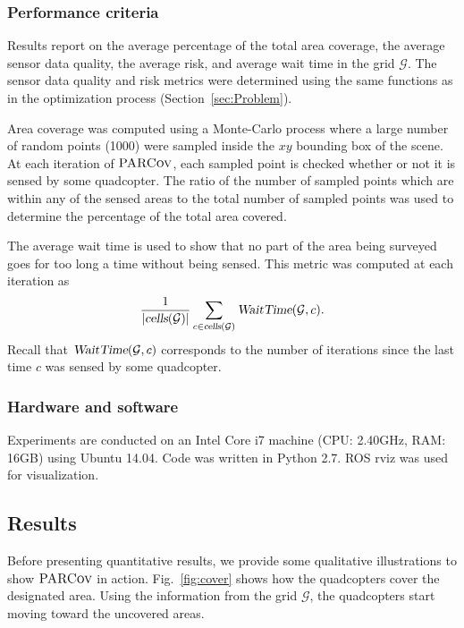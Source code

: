 \documentclass[letterpaper, 10pt, conference]{ieeeconf}
\newcommand{\Symbol}[1]{\ensuremath{\mathcal{#1}}}
\newcommand{\Function}[1]{\ensuremath{{ \textsc{#1}}}}
\newcommand{\Var}[1]{\ensuremath{{{\textsl{#1}}}}}
\newcommand{\Name}{\Function{\small{PARCov}}}
\begin{document}
\subsubsection{Performance criteria}
\label{sec:Performance}
Results report on the average percentage of the total area coverage,
the average sensor data quality, the average risk, and average wait
time in the grid $\Symbol{G}$. The sensor data quality and risk
metrics were determined using the same functions as in the
optimization process (Section~\ref{sec:Problem}).

Area coverage was computed using a Monte-Carlo process where a large
number of random points (1000) were sampled inside the $xy$ bounding
box of the scene. At each iteration of $\Name$, each sampled point is
checked whether or not it is sensed by some quadcopter. The ratio of
the number of sampled points which are within any of the sensed areas
to the total number of sampled points was used to determine the
percentage of the total area covered.

The average wait time is used to show that no part of the area being
surveyed goes for too long a time without being sensed.  This metric
was computed at each iteration as
$$\frac{1}{|\Var{cells}(\Symbol{G})|}\sum_{c \in
  \Var{cells}(\Symbol{G})} \Var{WaitTime}(\Symbol{G}, c).$$
Recall that $\Var{WaitTime}(\Symbol{G}, c)$ corresponds to the number
of iterations since the last time $c$ was sensed by some quadcopter.

\subsubsection{Hardware and software}  Experiments are conducted on an Intel
Core i7 machine (CPU: 2.40GHz, RAM: 16GB) using Ubuntu 14.04. Code
was written in Python 2.7.  ROS rviz was used for visualization.

\subsection{Results}

Before presenting quantitative results, we provide some qualitative
illustrations to show $\Name$ in action.  Fig.~\ref{fig:cover} shows
how the quadcopters cover the designated area. Using the information
from the grid $\Symbol{G}$, the quadcopters start moving toward the
uncovered areas.
\end{document}
